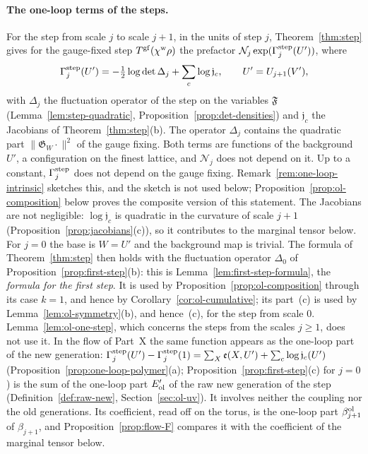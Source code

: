 \paragraph{The one-loop terms of the steps.} For the step from scale $j$ to scale $j+1$, in the units of step $j$, Theorem~\ref{thm:step} gives for the gauge-fixed step $T^{\rm gf}(\chi^{\rm w}\rho)$ the prefactor $\mathcal N_j\exp(\Gamma^{\rm step}_j(U'))$, where
\[
\Gamma^{\rm step}_j(U')=-\tfrac12\log\det\Delta_j+\sum_c\log\mathfrak j_c ,\qquad U'=U_{j+1}(V'),
\]
with $\Delta_j$ the fluctuation operator of the step on the variables $\mathfrak F$ (Lemma~\ref{lem:step-quadratic}, Proposition~\ref{prop:det-densities}) and $\mathfrak j_c$ the Jacobians of Theorem~\ref{thm:step}(b). The operator $\Delta_j$ contains the quadratic part $\|\mathfrak G_W\cdot\|^2$ of the gauge fixing. Both terms are functions of the background $U'$, a configuration on the finest lattice, and $\mathcal N_j$ does not depend on it. Up to a constant, $\Gamma^{\rm step}_j$ does not depend on the gauge fixing. Remark~\ref{rem:one-loop-intrinsic} sketches this, and the sketch is not used below; Proposition~\ref{prop:ol-composition} below proves the composite version of this statement. The Jacobians are not negligible: $\log\mathfrak j_c$ is quadratic in the curvature of scale $j+1$ (Proposition~\ref{prop:jacobians}(c)), so it contributes to the marginal tensor below. For $j=0$ the base is $W=U'$ and the background map is trivial. The formula of Theorem~\ref{thm:step} then holds with the fluctuation operator $\Delta_0$ of Proposition~\ref{prop:first-step}(b): this is Lemma~\ref{lem:first-step-formula}, the \emph{formula for the first step}. It is used by Proposition~\ref{prop:ol-composition} through its case $k=1$, and hence by Corollary~\ref{cor:ol-cumulative}; its part~(c) is used by Lemma~\ref{lem:ol-symmetry}(b), and hence~(c), for the step from scale $0$. Lemma~\ref{lem:ol-one-step}, which concerns the steps from the scales $j\ge1$, does not use it. In the flow of Part~X the same function appears as the one-loop part of the new generation: $\Gamma^{\rm step}_j(U')-\Gamma^{\rm step}_j(1)=\sum_X\mathfrak e(X,U')+\sum_c\log\mathfrak j_c(U')$ (Proposition~\ref{prop:one-loop-polymer}(a); Proposition~\ref{prop:first-step}(c) for $j=0$) is the sum of the one-loop part $E'_{\rm ol}$ of the raw new generation of the step (Definition~\ref{def:raw-new}, Section~\ref{sec:ol-uv}). It involves neither the coupling nor the old generations. Its coefficient, read off on the torus, is the one-loop part $\beta^{\rm ol}_{j+1}$ of $\beta_{j+1}$, and Proposition~\ref{prop:flow-F} compares it with the coefficient of the marginal tensor below.

